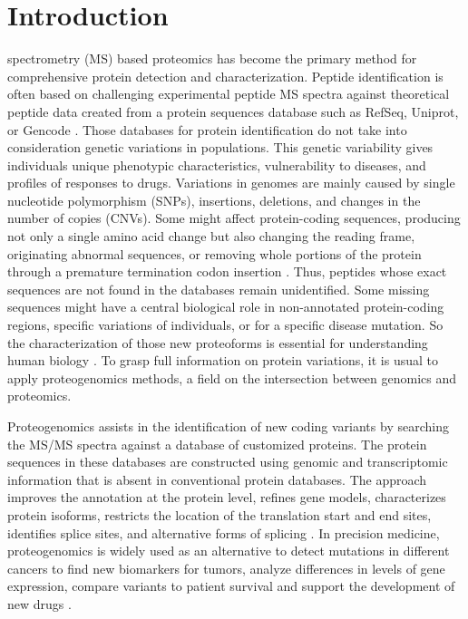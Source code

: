 \documentclass{ieeeaccess}
\begin{document}
\section{Introduction}
\label{sec:introduction}
 spectrometry (MS) based proteomics has become the primary method for comprehensive protein detection and characterization. Peptide identification is often based on challenging experimental peptide MS spectra against theoretical peptide data created from a protein sequences database such as RefSeq, Uniprot, or Gencode \cite{Sheynkman2016-fo}. Those databases for protein identification do not take into consideration genetic variations in populations. This genetic variability gives individuals unique phenotypic characteristics, vulnerability to diseases, and profiles of responses to drugs. Variations in genomes are mainly caused by single nucleotide polymorphism (SNPs), insertions, deletions, and changes in the number of copies (CNVs). Some might affect protein-coding sequences, producing not only a single amino acid change but also changing the reading frame, originating abnormal sequences, or removing whole portions of the protein through a premature termination codon insertion \cite{Vegvari2016-qm, Renuse2011-wl}. Thus, peptides whose exact sequences are not found in the databases remain unidentified. Some missing sequences might have a central biological role in non-annotated protein-coding regions, specific variations of individuals, or for a specific disease mutation. So the characterization of those new proteoforms is essential for understanding human biology \cite{Sheynkman2016-fo}. To grasp full information on protein variations, it is usual to apply proteogenomics methods, a field on the intersection between genomics and proteomics.

Proteogenomics assists in the identification of new coding variants by searching the MS/MS spectra against a database of customized proteins. The protein sequences in these databases are constructed using genomic and transcriptomic information that is absent in conventional protein databases. The approach improves the annotation at the protein level, refines gene models, characterizes protein isoforms, restricts the location of the translation start and end sites, identifies splice sites, and alternative forms of splicing \cite{Menschaert2017-ov, Ruggles2017-ez, Nesvizhskii2014-ej, Castellana2010-ro}. In precision medicine, proteogenomics is widely used as an alternative to detect mutations in different cancers to find new biomarkers for tumors, analyze differences in levels of gene expression, compare variants to patient survival and support the development of new drugs \cite{Woo2014-tk,Zhang2014-rb}. 
\end{document}
